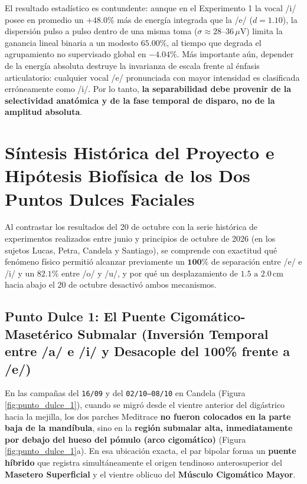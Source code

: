 \documentclass[11pt,a4paper]{article}
\begin{document}
El resultado estadístico es contundente: aunque en el Experimento 1 la vocal /i/ posee en promedio un $+48.0\%$ más de energía integrada que la /e/ ($d = 1.10$), la dispersión pulso a pulso dentro de una misma toma ($\sigma \approx 28\text{--}36\,\mu\text{V}$) limita la ganancia lineal binaria a un modesto $65.00\%$, al tiempo que degrada el agrupamiento no supervisado global en $-4.04\%$. Más importante aún, depender de la energía absoluta destruye la invarianza de escala frente al énfasis articulatorio: cualquier vocal /e/ pronunciada con mayor intensidad es clasificada erróneamente como /i/. Por lo tanto, \textbf{la separabilidad debe provenir de la selectividad anatómica y de la fase temporal de disparo, no de la amplitud absoluta}.

\section{Síntesis Histórica del Proyecto e Hipótesis Biofísica de los Dos Puntos Dulces Faciales}

Al contrastar los resultados del 20 de octubre con la serie histórica de experimentos realizados entre junio y principios de octubre de 2026 (en los sujetos Lucas, Petra, Candela y Santiago), se comprende con exactitud qué fenómeno físico permitió alcanzar previamente un $\mathbf{100\%}$ de separación entre /e/ e /i/ y un $\mathbf{82.1\%}$ entre /o/ y /u/, y por qué un desplazamiento de $1.5\text{ a }2.0\,\text{cm}$ hacia abajo el 20 de octubre desactivó ambos mecanismos.

\subsection{Punto Dulce 1: El Puente Cigomático-Masetérico Submalar (Inversión Temporal entre /a/ e /i/ y Desacople del 100\% frente a /e/)}
En las campañas del \texttt{16/09} y del \texttt{02/10--08/10} en Candela (Figura \ref{fig:punto_dulce_1}), cuando se migró desde el vientre anterior del digástrico hacia la mejilla, los dos parches Meditrace \textbf{no fueron colocados en la parte baja de la mandíbula}, sino en la \textbf{región submalar alta, inmediatamente por debajo del hueso del pómulo (arco cigomático)} (Figura \ref{fig:punto_dulce_1}a). En esa ubicación exacta, el par bipolar forma un \textbf{puente híbrido} que registra simultáneamente el origen tendinoso anterosuperior del \textbf{Masetero Superficial} y el vientre oblicuo del \textbf{Músculo Cigomático Mayor}.
\end{document}
